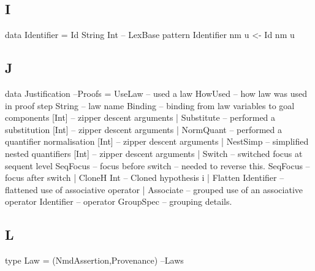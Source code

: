 \subsection{I}

\begin{code}
data Identifier = Id String Int                                    -- LexBase
pattern Identifier nm u <- Id nm u
\end{code}

\newpage
\subsection{J}

\begin{code}
data Justification                                                    --Proofs
  = UseLaw             -- used a law
      HowUsed              -- how law was used in proof step
      String               -- law name
      Binding              -- binding from law variables to goal components
      [Int]                -- zipper descent arguments
  | Substitute         -- performed a substitution
      [Int]                -- zipper descent arguments
  | NormQuant          -- performed a quantifier normalisation
      [Int]                -- zipper descent arguments
  | NestSimp           -- simplified nested quantifiers
      [Int]                -- zipper descent arguments
  | Switch             -- switched focus at sequent level
      SeqFocus             -- focus before switch -- needed to reverse this.
      SeqFocus             -- focus after switch
  | CloneH Int         --  Cloned hypothesis i
  | Flatten Identifier -- flattened use of associative operator
  | Associate          -- grouped use of an associative operator
      Identifier           -- operator
      GroupSpec            -- grouping details.
\end{code}


\subsection{L}

\begin{code}
type Law = (NmdAssertion,Provenance)                                    --Laws
\end{code}

